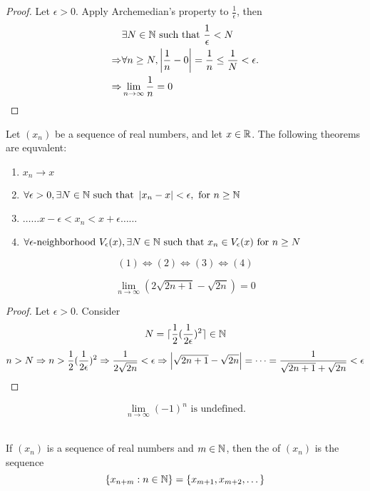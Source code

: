 \documentclass[a4paper,12pt]{article}
\begin{document}
\begin{proof}
    Let \(\epsilon>0\). Apply Archemedian's property to \(\frac{1}{\epsilon}\), then
    \begin{align*}
        & \exists N\in \mathbb{N} \text{ such that }\frac{1}{\epsilon}<N \\
        \Rightarrow & \forall n \ge N, \left\lvert \frac{1}{n}-0\right\rvert = \frac{1}{n}\le \frac{1}{N} < \epsilon.\\
        \Rightarrow & \lim_{n \to \infty}\frac{1}{n} = 0
    \end{align*}
\end{proof}
\newpage
\begin{theorem}
    Let \((x_n)\) be a sequence of real numbers, and let \(x \in \mathbb{R}\). The following theorems are equvalent:
\begin{enumerate}
    \item \(x_n \rightarrow x\)
    \item \(\forall \epsilon > 0, \exists N \in \mathbb{N} \text{ such that } \left\lvert x_n-x\right\rvert<\epsilon,\text{ for }n\ge \mathbb{N} \)
    \item \(\dots \dots x - \epsilon<x_n<x+\epsilon\dots\dots\)
    \item \(\forall\epsilon\text{-neighborhood } V_\epsilon(x),\exists N \in \mathbb{N} \text{ such that } x_n \in V_\epsilon(x) \text{ for } n\ge N\)\\
\end{enumerate}
\[(1)\Leftrightarrow(2)\Leftrightarrow(3)\Leftrightarrow(4)\]
\end{theorem}

\begin{proposition}
    \[\lim_{n\to \infty}(2\sqrt{2n+1}-\sqrt{2n})=0\]
\end{proposition}

\begin{proof}
    Let \(\epsilon > 0\). Consider \[N = \lceil\frac{1}{2}(\frac{1}{2\epsilon})^2\rceil\in\mathbb{N}\]
    \[n>N\Rightarrow n>\frac{1}{2}(\frac{1}{2\epsilon})^2 \Rightarrow \frac{1}{2\sqrt{2n}}<\epsilon\Rightarrow\left\lvert \sqrt{2n+1}-\sqrt{2n}\right\rvert = \dots = \frac{1}{\sqrt{2n+1}+\sqrt{2n}}<\epsilon\]
\end{proof}

\begin{remark}
    \[\lim_{n\to\infty}(-1)^n\text{ is undefined.}\]\\
\end{remark}

\begin{definition}
    If \((x_n)\) is a sequence of real numbers and \(m \in \mathbb{N}\), then the  of \((x_n)\) is the sequence 
    \[\{x_{n+m}:n\in\mathbb{N}\}=\{x_{m+1}, x_{m+2}, \dots\}\]
\end{definition}
\end{document}
